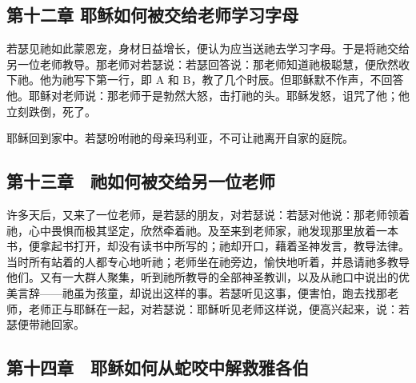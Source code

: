 
\subsection{第十二章 耶稣如何被交给老师学习字母}

若瑟见祂如此蒙恩宠，身材日益增长，便认为应当送祂去学习字母。于是将祂交给另一位老师教导。那老师对若瑟说：若瑟回答说：那老师知道祂极聪慧，便欣然收下祂。他为祂写下第一行，即 A 和 B，教了几个时辰。但耶稣默不作声，不回答他。耶稣对老师说：那老师于是勃然大怒，击打祂的头。耶稣发怒，诅咒了他；他立刻跌倒，死了。\par

耶稣回到家中。若瑟吩咐祂的母亲玛利亚，不可让祂离开自家的庭院。\par


\subsection{第十三章　祂如何被交给另一位老师}

许多天后，又来了一位老师，是若瑟的朋友，对若瑟说：若瑟对他说：那老师领着祂，心中畏惧而极其坚定，欣然牵着祂。及至来到老师家，祂发现那里放着一本书，便拿起书打开，却没有读书中所写的；祂却开口，藉着圣神发言，教导法律。当时所有站着的人都专心地听祂；老师坐在祂旁边，愉快地听着，并恳请祂多教导他们。又有一大群人聚集，听到祂所教导的全部神圣教训，以及从祂口中说出的优美言辞——祂虽为孩童，却说出这样的事。若瑟听见这事，便害怕，跑去找那老师，老师正与耶稣在一起，对若瑟说：耶稣听见老师这样说，便高兴起来，说：若瑟便带祂回家。\par


\subsection{第十四章　耶稣如何从蛇咬中解救雅各伯}


